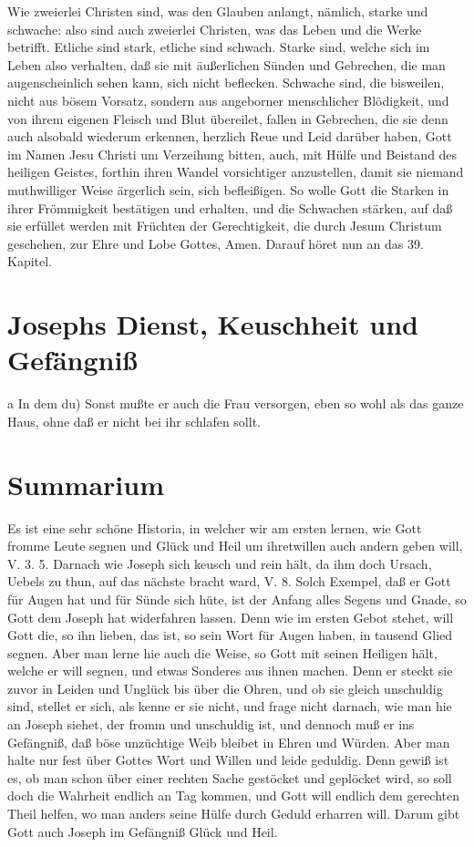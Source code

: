 Wie zweierlei Christen sind, was den Glauben anlangt, nämlich, starke und schwache: also sind auch zweierlei Christen, was das Leben und die Werke betrifft. Etliche sind stark, etliche sind schwach. Starke sind, welche sich im Leben also verhalten, daß sie mit äußerlichen Sünden und Gebrechen, die man augenscheinlich sehen kann, sich nicht beflecken. Schwache sind, die bisweilen, nicht aus bösem Vorsatz, sondern aus angeborner menschlicher Blödigkeit, und von ihrem eigenen Fleisch und Blut übereilet, fallen in Gebrechen, die sie denn auch alsobald wiederum erkennen, herzlich Reue und Leid darüber haben, Gott im Namen Jesu Christi um Verzeihung bitten, auch, mit Hülfe und Beistand des heiligen Geistes, forthin ihren Wandel vorsichtiger anzustellen, damit sie niemand muthwilliger Weise ärgerlich sein, sich befleißigen. So wolle Gott die Starken in ihrer Frömmigkeit bestätigen und erhalten, und die Schwachen stärken, auf daß sie erfüllet werden mit Früchten der Gerechtigkeit, die durch Jesum Christum geschehen, zur Ehre und Lobe Gottes, Amen. Darauf höret nun an das 39. Kapitel.

\section{Josephs Dienst, Keuschheit und Gefängniß}

a In dem du) Sonst mußte er auch die Frau versorgen, eben so wohl als das ganze Haus, ohne daß er nicht bei ihr schlafen sollt.

\section{Summarium}

Es ist eine sehr schöne Historia, in welcher wir am ersten lernen, wie Gott fromme Leute segnen und Glück und Heil um ihretwillen auch andern geben will, V. 3. 5. Darnach wie Joseph sich keusch und rein hält, da ihm doch Ursach, Uebels zu thun, auf das nächste bracht ward, V. 8. Solch Exempel, daß er Gott für Augen hat und für Sünde sich hüte, ist der Anfang alles Segens und Gnade, so Gott dem Joseph hat widerfahren lassen. Denn wie im ersten Gebot stehet, will Gott die, so ihn lieben, das ist, so sein Wort für Augen haben, in tausend Glied segnen. Aber man lerne hie auch die Weise, so Gott mit seinen Heiligen hält, welche er will segnen, und etwas Sonderes aus ihnen machen. Denn er steckt sie zuvor in Leiden und Unglück bis über die Ohren, und ob sie gleich unschuldig sind, stellet er sich, als kenne er sie nicht, und frage nicht darnach, wie man hie an Joseph siehet, der fromm und unschuldig ist, und dennoch muß er ins Gefängniß, daß böse unzüchtige Weib bleibet in Ehren und Würden. Aber man halte nur fest über Gottes Wort und Willen und leide geduldig. Denn gewiß ist es, ob man schon über einer rechten Sache gestöcket und geplöcket wird, so soll doch die Wahrheit endlich an Tag kommen, und Gott will endlich dem gerechten Theil helfen, wo man anders seine Hülfe durch Geduld erharren will. Darum gibt Gott auch Joseph im Gefängniß Glück und Heil.

